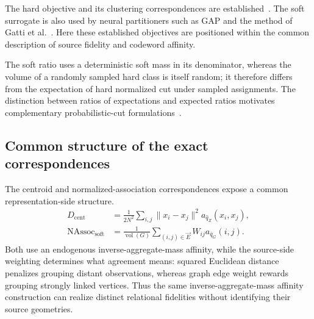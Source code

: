 The hard objective and its clustering correspondences are established~\citep{shi2000normalized,dhillon2004kernel}.
The soft surrogate is also used by neural partitioners such as GAP and the method of Gatti et al.~\citep{nazi2019gap,gatti2022deep}.
Here these established objectives are positioned within the common description of source fidelity and codeword affinity.

The soft ratio uses a deterministic soft mass in its denominator, whereas the volume of a randomly sampled hard class is itself random; it therefore differs from the expectation of hard normalized cut under sampled assignments.
The distinction between ratios of expectations and expected ratios motivates complementary probabilistic-cut formulations~\citep{ghriss2026beyond}.

\subsection{Common structure of the exact correspondences}

The centroid and normalized-association correspondences expose a common representation-side structure.
\begin{equation}
\begin{aligned}
D_{\mathrm{cent}}
&=\frac1{2N^2}\sum_{i,j}\|x_i-x_j\|^2a_{\hat q_Z}(x_i,x_j),\\
\operatorname{NAssoc}_{\mathrm{soft}}
&=\frac1{\operatorname{vol}(G)}\sum_{(i,j)\in\vec E}W_{ij}a_{\bar q_G}(i,j).
\end{aligned}
\label{eq:vq-ncut-relational-correspondence}
\end{equation}
Both use an endogenous inverse-aggregate-mass affinity, while the source-side weighting determines what agreement means: squared Euclidean distance penalizes grouping distant observations, whereas graph edge weight rewards grouping strongly linked vertices.
Thus the same inverse-aggregate-mass affinity construction can realize distinct relational fidelities without identifying their source geometries.
